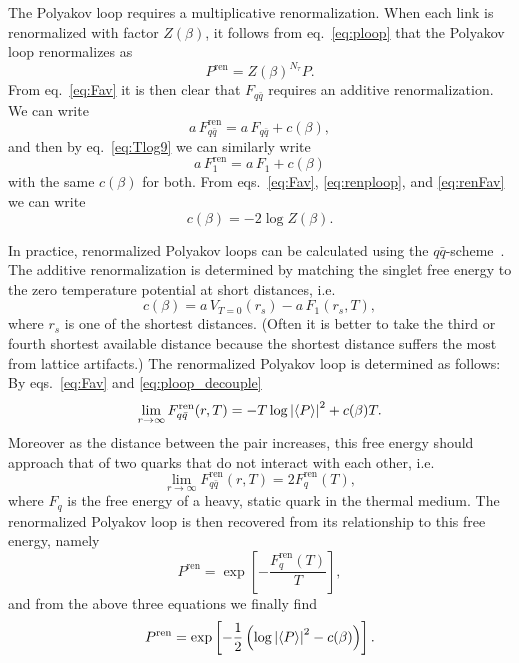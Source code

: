 The Polyakov loop requires a multiplicative renormalization. When each link
is renormalized with factor $Z(\beta)$, it follows from
eq.~\eqref{eq:ploop} that the Polyakov loop renormalizes as
\begin{equation}\label{eq:renploop}
  P^{\text{ren}}=Z(\beta)^{N_\tau}P.
\end{equation}
From eq.~\eqref{eq:Fav} it is then clear that $F_{q\bar{q}}$ requires an
additive renormalization. We can write
\begin{equation}\label{eq:renFav}
  a\,F_{q\bar{q}}^{\text{ren}}=a\,F_{q\bar{q}}+c(\beta),
\end{equation}
and then by eq.~\eqref{eq:Tlog9} we can similarly write
\begin{equation}
  a\,F_1^{\text{ren}}=a\,F_1+c(\beta)
\end{equation}
with the same $c(\beta)$ for both. From eqs.~\eqref{eq:Fav},
\eqref{eq:renploop}, and \eqref{eq:renFav} we can write
\begin{equation}
  c(\beta)=-2\log Z(\beta).
\end{equation}

In practice, renormalized Polyakov loops can be calculated using
the $q\bar{q}$-scheme~\cite{kaczmarek_heavy_2002}. The additive
renormalization is determined by matching the singlet free energy
to the zero temperature potential at short distances, i.e.
\begin{equation}
  c(\beta)=a\,V_{T=0}(r_s)-a\,F_1(r_s,T),
\end{equation}
where $r_s$ is one of the shortest distances. (Often it is better to take
the third or fourth shortest available distance because the shortest
distance suffers the most from lattice artifacts.) The renormalized
Polyakov loop is determined as follows:
By eqs.~\eqref{eq:Fav} and \eqref{eq:ploop_decouple}
\begin{equation}
  \lim_{r\to\infty}F_{q\bar{q}}^{\text{ren}}(r,T)
             =-T\log\left|\ev{P}\right|^2+c(\beta)T.
\end{equation}
Moreover as the distance between the pair increases, this free energy
should approach that of two quarks that do not interact with each other, i.e.
\begin{equation}
  \lim_{r\to\infty}F_{q\bar{q}}^{\text{ren}}(r,T)=2F_q^{\text{ren}}(T),
\end{equation}
where $F_q$ is the free energy of a heavy, static quark in the thermal
medium. The renormalized Polyakov loop is then recovered from its
relationship to this free energy, namely
\begin{equation}
  P^{\text{ren}}=\exp\left[-\frac{F_q^{\text{ren}}(T)}{T}\right],
\end{equation}
and from the above three equations we finally find
\begin{equation}
  P^{\text{ren}}=\exp\left[-\frac{1}{2}\left(\log\left|\ev{P}\right|^2
                                             -c(\beta)\right)\right].
\end{equation}

